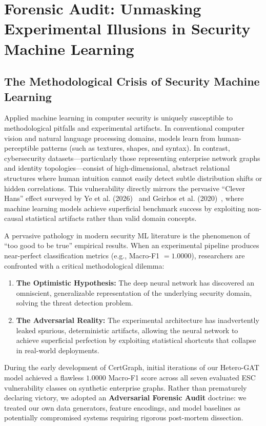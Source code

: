 \chapter{Forensic Audit: Unmasking Experimental Illusions in Security Machine Learning}
\label{ch:audit}

\section{The Methodological Crisis of Security Machine Learning}
Applied machine learning in computer security is uniquely susceptible to methodological pitfalls and experimental artifacts. In conventional computer vision and natural language processing domains, models learn from human-perceptible patterns (such as textures, shapes, and syntax). In contrast, cybersecurity datasets---particularly those representing enterprise network graphs and identity topologies---consist of high-dimensional, abstract relational structures where human intuition cannot easily detect subtle distribution shifts or hidden correlations. This vulnerability directly mirrors the pervasive ``Clever Hans'' effect surveyed by Ye et al. (2026)~\cite{ye2026cleverhans} and Geirhos et al. (2020)~\cite{geirhos2020shortcut}, where machine learning models achieve superficial benchmark success by exploiting non-causal statistical artifacts rather than valid domain concepts.

A pervasive pathology in modern security ML literature is the phenomenon of ``too good to be true'' empirical results. When an experimental pipeline produces near-perfect classification metrics (e.g., Macro-F1 $= 1.0000$), researchers are confronted with a critical methodological dilemma:
\begin{enumerate}
    \item \textbf{The Optimistic Hypothesis:} The deep neural network has discovered an omniscient, generalizable representation of the underlying security domain, solving the threat detection problem.
    \item \textbf{The Adversarial Reality:} The experimental architecture has inadvertently leaked spurious, deterministic artifacts, allowing the neural network to achieve superficial perfection by exploiting statistical shortcuts that collapse in real-world deployments.
\end{enumerate}

During the early development of CertGraph, initial iterations of our Hetero-GAT model achieved a flawless $1.0000$ Macro-F1 score across all seven evaluated ESC vulnerability classes on synthetic enterprise graphs. Rather than prematurely declaring victory, we adopted an \textbf{Adversarial Forensic Audit} doctrine: we treated our own data generators, feature encodings, and model baselines as potentially compromised systems requiring rigorous post-mortem dissection.

